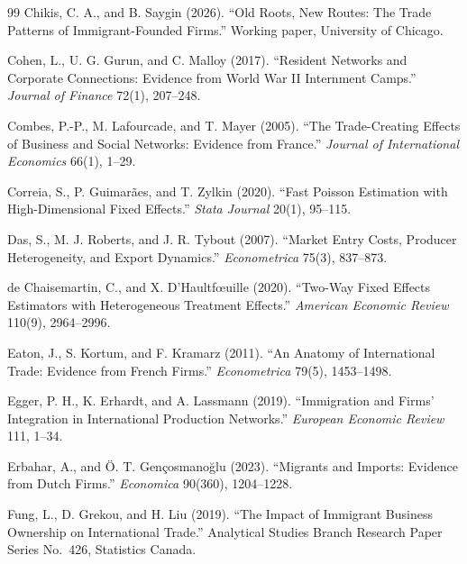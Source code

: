 \documentclass[12pt]{article}
\theoremstyle{remark}
\begin{document}
\begin{thebibliography}{99}
Chikis, C. A., and B. Saygin (2026). ``Old Roots, New Routes: The Trade Patterns of Immigrant-Founded Firms.'' Working paper, University of Chicago.

Cohen, L., U. G. Gurun, and C. Malloy (2017). ``Resident Networks and Corporate Connections: Evidence from World War II Internment Camps.'' \textit{Journal of Finance} 72(1), 207--248.

Combes, P.-P., M. Lafourcade, and T. Mayer (2005). ``The Trade-Creating Effects of Business and Social Networks: Evidence from France.'' \textit{Journal of International Economics} 66(1), 1--29.

Correia, S., P. Guimar\~aes, and T. Zylkin (2020). ``Fast Poisson Estimation with High-Dimensional Fixed Effects.'' \textit{Stata Journal} 20(1), 95--115.

Das, S., M. J. Roberts, and J. R. Tybout (2007). ``Market Entry Costs, Producer Heterogeneity, and Export Dynamics.'' \textit{Econometrica} 75(3), 837--873.

de Chaisemartin, C., and X. D'Haultf{\oe}uille (2020). ``Two-Way Fixed Effects Estimators with Heterogeneous Treatment Effects.'' \textit{American Economic Review} 110(9), 2964--2996.

Eaton, J., S. Kortum, and F. Kramarz (2011). ``An Anatomy of International Trade: Evidence from French Firms.'' \textit{Econometrica} 79(5), 1453--1498.

Egger, P. H., K. Erhardt, and A. Lassmann (2019). ``Immigration and Firms' Integration in International Production Networks.'' \textit{European Economic Review} 111, 1--34.

Erbahar, A., and \"O. T. Gen\c{c}osmano\u{g}lu (2023). ``Migrants and Imports: Evidence from Dutch Firms.'' \textit{Economica} 90(360), 1204--1228.

Fung, L., D. Grekou, and H. Liu (2019). ``The Impact of Immigrant Business Ownership on International Trade.'' Analytical Studies Branch Research Paper Series No.~426, Statistics Canada.


\end{thebibliography}
\end{document}
